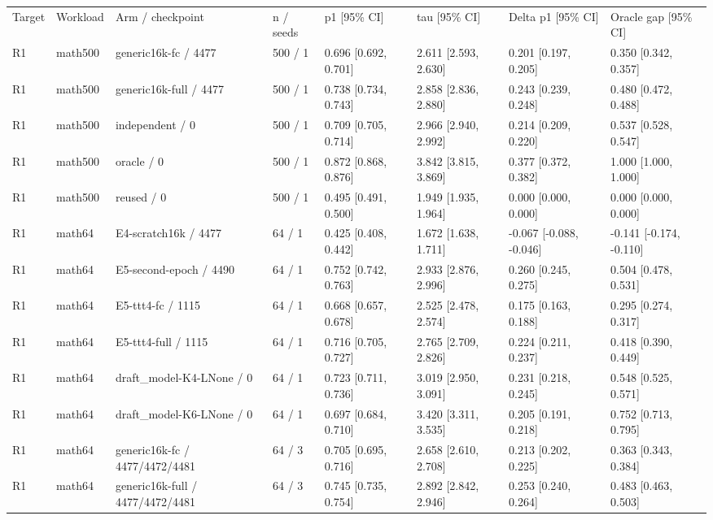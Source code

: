 \begin{tabular}{llllllll}
\hline
Target & Workload & Arm / checkpoint & n / seeds & p1 [95\% CI] & tau [95\% CI] & Delta p1 [95\% CI] & Oracle gap [95\% CI] \\
R1 & math500 & generic16k-fc / 4477 & 500 / 1 & 0.696 [0.692, 0.701] & 2.611 [2.593, 2.630] & 0.201 [0.197, 0.205] & 0.350 [0.342, 0.357] \\
R1 & math500 & generic16k-full / 4477 & 500 / 1 & 0.738 [0.734, 0.743] & 2.858 [2.836, 2.880] & 0.243 [0.239, 0.248] & 0.480 [0.472, 0.488] \\
R1 & math500 & independent / 0 & 500 / 1 & 0.709 [0.705, 0.714] & 2.966 [2.940, 2.992] & 0.214 [0.209, 0.220] & 0.537 [0.528, 0.547] \\
R1 & math500 & oracle / 0 & 500 / 1 & 0.872 [0.868, 0.876] & 3.842 [3.815, 3.869] & 0.377 [0.372, 0.382] & 1.000 [1.000, 1.000] \\
R1 & math500 & reused / 0 & 500 / 1 & 0.495 [0.491, 0.500] & 1.949 [1.935, 1.964] & 0.000 [0.000, 0.000] & 0.000 [0.000, 0.000] \\
R1 & math64 & E4-scratch16k / 4477 & 64 / 1 & 0.425 [0.408, 0.442] & 1.672 [1.638, 1.711] & -0.067 [-0.088, -0.046] & -0.141 [-0.174, -0.110] \\
R1 & math64 & E5-second-epoch / 4490 & 64 / 1 & 0.752 [0.742, 0.763] & 2.933 [2.876, 2.996] & 0.260 [0.245, 0.275] & 0.504 [0.478, 0.531] \\
R1 & math64 & E5-ttt4-fc / 1115 & 64 / 1 & 0.668 [0.657, 0.678] & 2.525 [2.478, 2.574] & 0.175 [0.163, 0.188] & 0.295 [0.274, 0.317] \\
R1 & math64 & E5-ttt4-full / 1115 & 64 / 1 & 0.716 [0.705, 0.727] & 2.765 [2.709, 2.826] & 0.224 [0.211, 0.237] & 0.418 [0.390, 0.449] \\
R1 & math64 & draft\_model-K4-LNone / 0 & 64 / 1 & 0.723 [0.711, 0.736] & 3.019 [2.950, 3.091] & 0.231 [0.218, 0.245] & 0.548 [0.525, 0.571] \\
R1 & math64 & draft\_model-K6-LNone / 0 & 64 / 1 & 0.697 [0.684, 0.710] & 3.420 [3.311, 3.535] & 0.205 [0.191, 0.218] & 0.752 [0.713, 0.795] \\
R1 & math64 & generic16k-fc / 4477/4472/4481 & 64 / 3 & 0.705 [0.695, 0.716] & 2.658 [2.610, 2.708] & 0.213 [0.202, 0.225] & 0.363 [0.343, 0.384] \\
R1 & math64 & generic16k-full / 4477/4472/4481 & 64 / 3 & 0.745 [0.735, 0.754] & 2.892 [2.842, 2.946] & 0.253 [0.240, 0.264] & 0.483 [0.463, 0.503] \\

\end{tabular}
